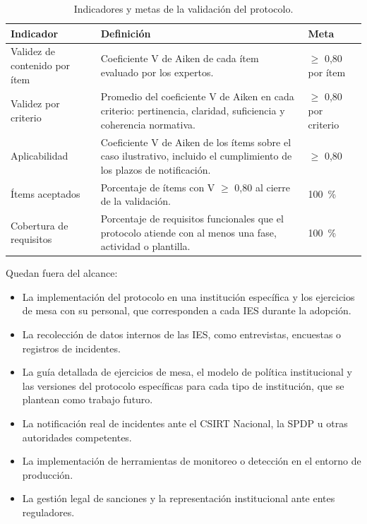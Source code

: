 \begin{table}[htbp]
  \centering
  \caption{Indicadores y metas de la validación del protocolo.}
  \label{tab:indicadores_validacion}
  \small
  \begin{tabular}{|L{\tabcolsep}|L{\tabcolsep}|L{\tabcolsep}|}
    \hline
    \textbf{Indicador} & \textbf{Definición} & \textbf{Meta} \\
    \hline
    Validez de contenido por ítem & Coeficiente V de Aiken de cada ítem evaluado por los expertos. & $\geq$ 0,80 por ítem \\
    \hline
    Validez por criterio & Promedio del coeficiente V de Aiken en cada criterio: pertinencia, claridad, suficiencia y coherencia normativa. & $\geq$ 0,80 por criterio \\
    \hline
    Aplicabilidad & Coeficiente V de Aiken de los ítems sobre el caso ilustrativo, incluido el cumplimiento de los plazos de notificación. & $\geq$ 0,80 \\
    \hline
    Ítems aceptados & Porcentaje de ítems con V $\geq$ 0,80 al cierre de la validación. & 100~\% \\
    \hline
    Cobertura de requisitos & Porcentaje de requisitos funcionales que el protocolo atiende con al menos una fase, actividad o plantilla. & 100~\% \\
    \hline
  \end{tabular}
  \par\normalsize\raggedright
\end{table}

Quedan fuera del alcance:
\begin{itemize}
  \item La implementación del protocolo en una institución específica y los ejercicios de mesa con su personal, que corresponden a cada IES durante la adopción.
  \item La recolección de datos internos de las IES, como entrevistas, encuestas o registros de incidentes.
  \item La guía detallada de ejercicios de mesa, el modelo de política institucional y las versiones del protocolo específicas para cada tipo de institución, que se plantean como trabajo futuro.
  \item La notificación real de incidentes ante el CSIRT Nacional, la SPDP u otras autoridades competentes.
  \item La implementación de herramientas de monitoreo o detección en el entorno de producción.
  \item La gestión legal de sanciones y la representación institucional ante entes reguladores.
\end{itemize}

